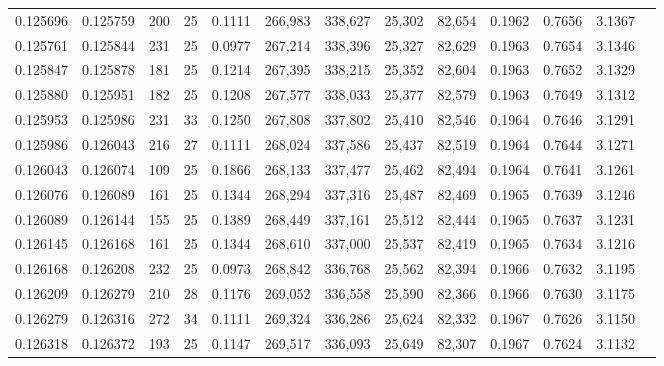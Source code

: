 \begin{tabular}{rrrrrrrrrrrrr}
0.125696 & 0.125759 & 200 &  25 &                                     0.1111 & 266,983 & 338,627 &  25,302 &  82,654 & 0.1962 & 0.7656 & 3.1367 \\
0.125761 & 0.125844 & 231 &  25 &                                     0.0977 & 267,214 & 338,396 &  25,327 &  82,629 & 0.1963 & 0.7654 & 3.1346 \\
0.125847 & 0.125878 & 181 &  25 &                                     0.1214 & 267,395 & 338,215 &  25,352 &  82,604 & 0.1963 & 0.7652 & 3.1329 \\
0.125880 & 0.125951 & 182 &  25 &                                     0.1208 & 267,577 & 338,033 &  25,377 &  82,579 & 0.1963 & 0.7649 & 3.1312 \\
0.125953 & 0.125986 & 231 &  33 &                                     0.1250 & 267,808 & 337,802 &  25,410 &  82,546 & 0.1964 & 0.7646 & 3.1291 \\
0.125986 & 0.126043 & 216 &  27 &                                     0.1111 & 268,024 & 337,586 &  25,437 &  82,519 & 0.1964 & 0.7644 & 3.1271 \\
0.126043 & 0.126074 & 109 &  25 &                                     0.1866 & 268,133 & 337,477 &  25,462 &  82,494 & 0.1964 & 0.7641 & 3.1261 \\
0.126076 & 0.126089 & 161 &  25 &                                     0.1344 & 268,294 & 337,316 &  25,487 &  82,469 & 0.1965 & 0.7639 & 3.1246 \\
0.126089 & 0.126144 & 155 &  25 &                                     0.1389 & 268,449 & 337,161 &  25,512 &  82,444 & 0.1965 & 0.7637 & 3.1231 \\
0.126145 & 0.126168 & 161 &  25 &                                     0.1344 & 268,610 & 337,000 &  25,537 &  82,419 & 0.1965 & 0.7634 & 3.1216 \\
0.126168 & 0.126208 & 232 &  25 &                                     0.0973 & 268,842 & 336,768 &  25,562 &  82,394 & 0.1966 & 0.7632 & 3.1195 \\
0.126209 & 0.126279 & 210 &  28 &                                     0.1176 & 269,052 & 336,558 &  25,590 &  82,366 & 0.1966 & 0.7630 & 3.1175 \\
0.126279 & 0.126316 & 272 &  34 &                                     0.1111 & 269,324 & 336,286 &  25,624 &  82,332 & 0.1967 & 0.7626 & 3.1150 \\
0.126318 & 0.126372 & 193 &  25 &                                     0.1147 & 269,517 & 336,093 &  25,649 &  82,307 & 0.1967 & 0.7624 & 3.1132 \\

\end{tabular}
